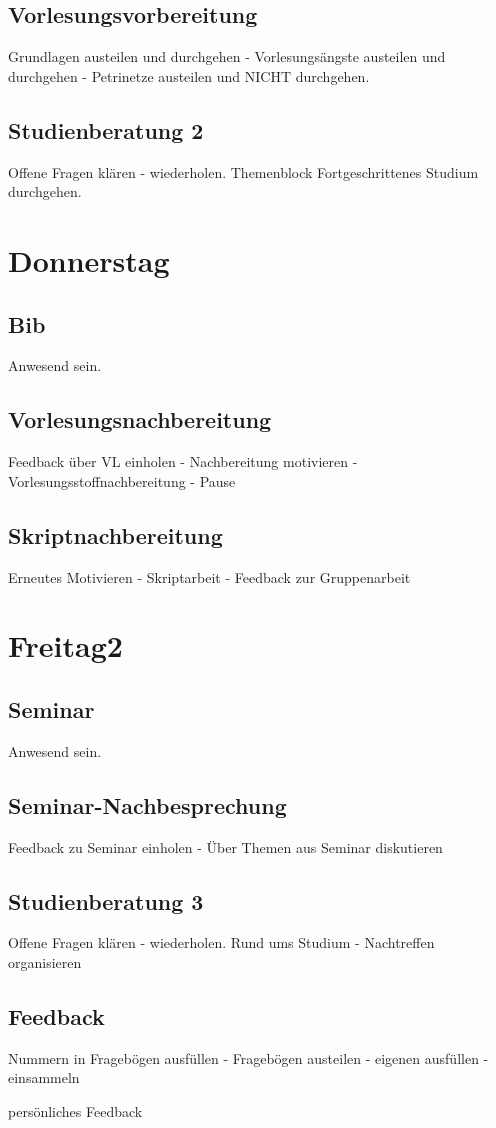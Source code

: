 \documentclass[10pt,a4paper,oneside,ngerman,numbers=noenddot]{scrartcl}
\begin{document}
	\subsection{Vorlesungsvorbereitung}
		Grundlagen austeilen und durchgehen - Vorlesungsängste austeilen und durchgehen - Petrinetze austeilen und NICHT durchgehen.
	\subsection{Studienberatung 2}
		Offene Fragen klären - wiederholen. Themenblock Fortgeschrittenes Studium durchgehen.
	
\section{Donnerstag}
	\subsection{Bib}
		Anwesend sein.
	\subsection{Vorlesungsnachbereitung}
		Feedback über VL einholen - Nachbereitung motivieren - Vorlesungsstoffnachbereitung - Pause
	\subsection{Skriptnachbereitung}
		Erneutes Motivieren - Skriptarbeit - Feedback zur Gruppenarbeit

\section{Freitag2}
	\subsection{Seminar}
		Anwesend sein.
	\subsection{Seminar-Nachbesprechung}
		Feedback zu Seminar einholen - Über Themen aus Seminar diskutieren
	\subsection{Studienberatung 3}
		Offene Fragen klären - wiederholen. Rund ums Studium - Nachtreffen organisieren
	\subsection{Feedback}
		Nummern in Fragebögen ausfüllen - Fragebögen austeilen - eigenen ausfüllen - einsammeln

		persönliches Feedback
\end{document}
